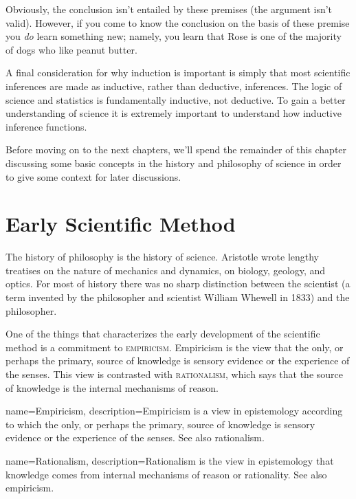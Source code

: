 Obviously, the conclusion isn't entailed by these premises (the argument isn't valid). However, if you come to know the conclusion on the basis of these premise you \emph{do} learn something new; namely, you learn that Rose is one of the majority of dogs who like peanut butter.

A final consideration for why induction is important is simply that most scientific inferences are made as inductive, rather than deductive, inferences. The logic of science and statistics is fundamentally inductive, not deductive. To gain a better understanding of science it is extremely important to understand how inductive inference functions.

Before moving on to the next chapters, we'll spend the remainder of this chapter discussing some basic concepts in the history and philosophy of science in order to give some context for later discussions.

\section{Early Scientific Method}

The history of philosophy is the history of science. Aristotle wrote lengthy treatises on the nature of mechanics and dynamics, on biology, geology, and optics. For most of history there was no sharp distinction between the scientist (a term invented by the philosopher and scientist William Whewell in 1833) and the philosopher.

One of the things that characterizes the early development of the scientific method is a commitment to \textsc{\gls{empiricism}}. Empiricism is the view that the only, or perhaps the primary, source of knowledge is sensory evidence or the experience of the senses. This view is contrasted with \textsc{\gls{rationalism}}, which says that the source of knowledge is the internal mechanisms of reason.

{
name=Empiricism,
description={Empiricism is a view in epistemology according to which the only, or perhaps the primary, source of knowledge is sensory evidence or the experience of the senses. See also \gls{rationalism}.}
}

{
name=Rationalism,
description={Rationalism is the view in epistemology that knowledge comes from internal mechanisms of reason or rationality. See also \gls{empiricism}.}
}

